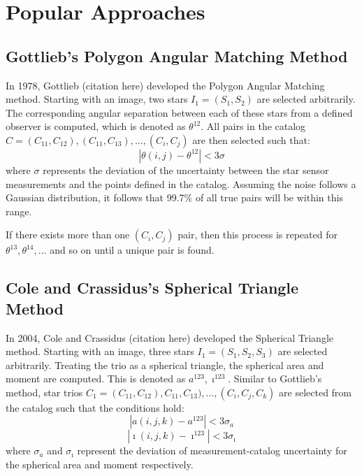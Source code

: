 \section{Popular Approaches}

\subsection{Gottlieb's Polygon Angular Matching Method}
In 1978, Gottlieb (citation here) developed the Polygon Angular Matching method. Starting with an image, two stars $I_1 = (S_1, S_2)$ are selected arbitrarily. The corresponding angular separation between each of these stars from a defined observer is computed, which is denoted as $\theta^{12}$. All pairs in the catalog $C = (C_{11}, C_{12}), (C_{11}, C_{13}), ..., (C_i, C_j)$ are then selected such that:
\begin{equation}
| \theta(i, j) - \theta^{12} | < 3 \sigma
\end{equation}
where $\sigma$ represents the deviation of the uncertainty between the star sensor measurements and the points defined in the catalog. Assuming the noise follows a Gaussian distribution, it follows that 99.7\% of all true pairs will be within this range.

If there exists more than one $(C_i, C_j)$ pair, then this process is repeated for $\theta^{13}, \theta^{14}, ...$ and so on until a unique pair is found.

\subsection{Cole and Crassidus's Spherical Triangle Method}
In 2004, Cole and Crassidus (citation here) developed the Spherical Triangle method. Starting with an image, three stars $I_1 = (S_1, S_2, S_3)$ are selected arbitrarily. Treating the trio as a spherical triangle, the spherical area and moment are computed. This is denoted as $a^{123}, \imath^{123}$. Similar to Gottlieb's method, star trios $C_1 = (C_{11}, C_{12}), C_{11}, C_{13}), ..., (C_i, C_j, C_k)$ are selected from the catalog such that the conditions hold:
\begin{equation}
| a(i, j, k) - a^{123} | < 3 \sigma_a
\end{equation}
\begin{equation}
| \imath(i, j, k) - \imath^{123} | < 3\sigma_{\imath}
\end{equation}
where $\sigma_a$ and $\sigma_{\imath}$ represent the deviation of measurement-catalog uncertainty for the spherical area and moment respectively. 

